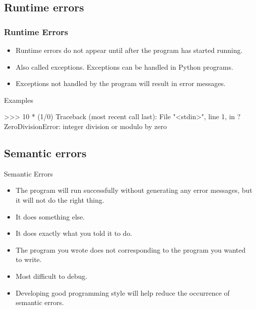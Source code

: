 \documentclass{beamer}
\begin{document}
\subsection{Runtime errors}
\begin{frame}[fragile]
\frametitle{Runtime Errors}
\begin{itemize}
\item Runtime errors do not appear until after the program has started running.
\item Also called \alert{exceptions}. Exceptions can be handled in Python programs.
\item Exceptions not handled by the program will result in error messages.
\end{itemize}
\begin{block}{Examples}
\begin{semiverbatim}
>>> 10 * (1/0)\pause
Traceback (most recent call last):
  File "<stdin>", line 1, in ?
ZeroDivisionError: integer division or modulo 
by zero
\end{semiverbatim}
\end{block}
\end{frame}


%
%
%
\subsection{Semantic errors}
\begin{frame}{Semantic Errors}
\begin{itemize}[<+->]
\item  The program  will \alert{run successfully} without generating any error messages, but it \alert{will
not} do the right thing. 
\item It does something else.
\item It does \alert{exactly} what you told it to do. 
\item The program you wrote does not corresponding to the program you \alert{wanted to write}.
\item \alert{Most difficult} to debug.
\item Developing \alert{good programming style} will help reduce the occurrence of semantic errors.
\end{itemize}
\end{frame}
\end{document}
